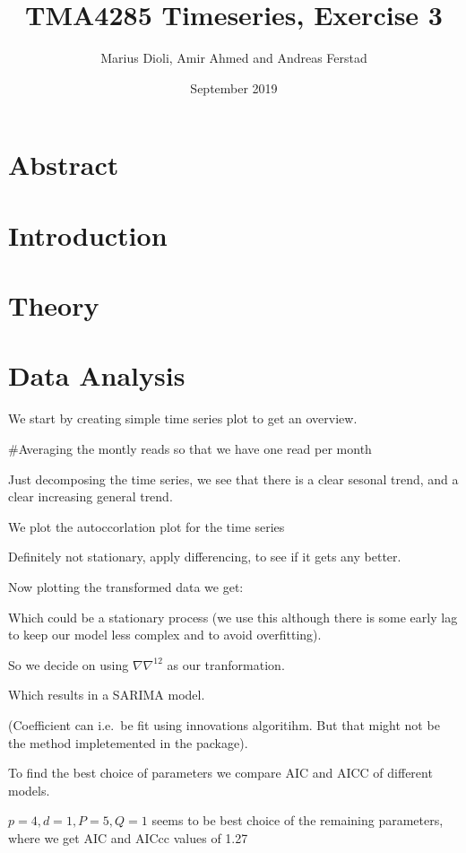 \documentclass[]{article}
\title{TMA4285 Timeseries, Exercise 3}
\author{Marius Dioli, Amir Ahmed and Andreas Ferstad}
\date{September 2019}
\begin{document}
\maketitle

\hypertarget{abstract}{%
\section{Abstract}\label{abstract}}

\hypertarget{introduction}{%
\section{Introduction}\label{introduction}}

\hypertarget{theory}{%
\section{Theory}\label{theory}}

\hypertarget{data-analysis}{%
\section{Data Analysis}\label{data-analysis}}

We start by creating simple time series plot to get an overview.

\#Averaging the montly reads so that we have one read per month

Just decomposing the time series, we see that there is a clear sesonal
trend, and a clear increasing general trend.

We plot the autoccorlation plot for the time series

Definitely not stationary, apply differencing, to see if it gets any
better.

Now plotting the transformed data we get:

Which could be a stationary process (we use this although there is some
early lag to keep our model less complex and to avoid overfitting).

So we decide on using \(\nabla\nabla^{12}\) as our tranformation.

Which results in a SARIMA model.

(Coefficient can i.e.~be fit using innovations algoritihm. But that
might not be the method impletemented in the package).

To find the best choice of parameters we compare AIC and AICC of
different models.

\(p=4, d=1, P=5, Q=1\) seems to be best choice of the remaining
parameters, where we get AIC and AICcc values of 1.27
\end{document}

